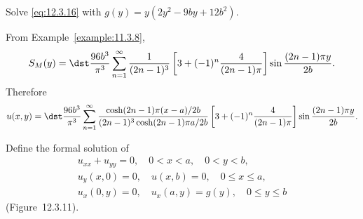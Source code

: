 \setcounter{example}{5}
\begin{example}
  \label{example:12.3.6} \rm Solve \eqref{eq:12.3.16} with $g(y)=y(2y^{2}-9by+12b^{2})$.
\end{example}
\begin{examplesolution}
\solution From Example~\ref{example:11.3.8},
\[
  S_{M}(y) =\dst\frac{96b^{3}}{\pi^{3}}\sum_{n=1}^{\infty}\frac{1}{(2n-1)^{3}}\left[3+(-1)^{n}\frac{4}{(2n-1)\pi}\right]\sin\frac{(2n-1)\pi y}{2b}.
\]
Therefore
\[
  u(x,y) =\dst\frac{96b^{3}}{\pi^{3}}\sum_{n=1}^{\infty}\frac{\cosh(2n-1)\pi(x-a)/2b}{(2n-1)^{3}\cosh(2n-1)\pi a/2b}\left[3+(-1)^{n}\frac{4}{(2n-1)\pi}\right]\sin\frac{(2n-1)\pi y}{2b}.
\]
\end{examplesolution}

\setcounter{example}{6}
\setcounter{equation}{19}
\begin{example}
  \label{example:12.3.7} \rm Define the formal solution of
  \begin{equation}
    \label{eq:12.3.20}
    \begin{array}{c}
      u_{xx}+u_{yy}=0,\quad0<x<a,\quad0<y<b,              \\
      u_{y}(x,0)=0,\quad u(x,b)=0,\quad0\le x\le a,       \\
      u_{x}(0,y)=0,\quad u_{x}(a,y)=g(y),\quad0\le y\le b
    \end{array}
  \end{equation}
  (Figure~12.3.11).
\end{example}
\setcounter{equation}{20}
